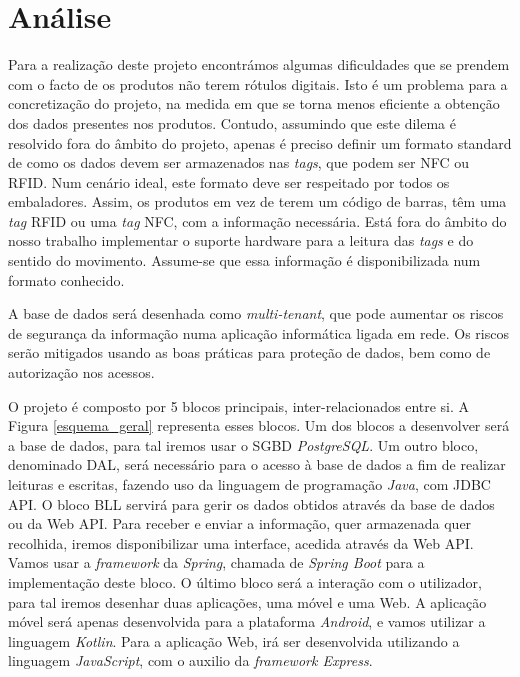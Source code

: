 %
%
\section*{Análise} \label{Analise}

Para a realização deste projeto encontrámos algumas dificuldades que se prendem com o facto de os produtos não terem rótulos digitais. Isto é um problema para a concretização do projeto, na medida em que se torna menos eficiente a obtenção dos dados presentes nos produtos. Contudo, assumindo que este dilema é resolvido fora do âmbito do projeto, apenas é preciso definir um formato standard de como os dados devem ser armazenados nas \textit{tags}, que podem ser NFC ou RFID. Num cenário ideal, este formato deve ser respeitado por todos os embaladores. Assim, os produtos em vez de terem um código de barras, têm uma \textit{tag} RFID ou uma \textit{tag} NFC, com a informação necessária. Está fora do âmbito do nosso trabalho implementar o suporte hardware para a leitura das \textit{tags} e do sentido do movimento. Assume-se que essa informação é disponibilizada num formato conhecido. 

A base de dados será desenhada como \textit{multi-tenant}, que pode aumentar os riscos de segurança da informação numa aplicação informática ligada em rede. Os riscos serão mitigados usando as boas práticas para proteção de dados, bem como de autorização nos acessos.

O projeto é composto por 5 blocos principais, inter-relacionados entre si. A Figura \ref{esquema_geral} representa esses blocos. Um dos blocos a desenvolver será a base de dados, para tal iremos usar o SGBD \textit{PostgreSQL}. Um outro bloco, denominado DAL, será necessário para o acesso à base de dados a fim de realizar leituras e escritas, fazendo uso da linguagem de programação \textit{Java}, com JDBC API. O bloco BLL servirá para gerir os dados obtidos através da base de dados ou da Web API. Para receber e enviar a informação, quer armazenada quer recolhida, iremos disponibilizar uma interface, acedida através da Web API. Vamos usar a \textit{framework} da \textit{Spring}, chamada de \textit{Spring Boot} para a implementação deste bloco. O último bloco será a interação com o utilizador, para tal iremos desenhar duas aplicações, uma móvel e uma Web. A aplicação móvel será apenas desenvolvida para a plataforma \textit{Android}, e vamos utilizar a linguagem \textit{Kotlin}. Para a aplicação Web, irá ser desenvolvida utilizando a linguagem \textit{JavaScript}, com o auxilio da \textit{framework Express}.

